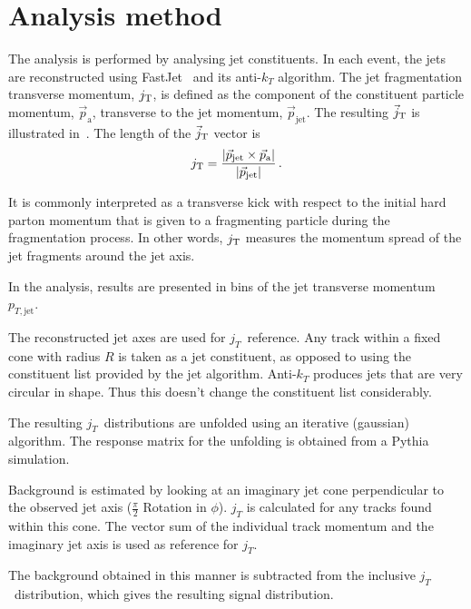 \section{Analysis method}
\label{sec:methods}

The analysis is performed by analysing jet constituents. In each event, the jets are reconstructed using FastJet~\cite{fastjet} and its anti-$k_T$ algorithm. The jet fragmentation transverse momentum, $j_{\rm T}$, is defined as the component of the constituent particle momentum, $\vec{p}_{\mathrm{a}}$, transverse to the jet momentum, $\vec{p}_{\mathrm{jet}}$. The resulting $\vec{j}_{\rm T}$ is illustrated in~. The length of the $\vec{j}_{\rm T}$ vector is
  \begin{equation}
    j_{\rm T} = \frac{|\vec{p}_{\mathrm{jet}} \times \vec{p}_{\mathrm{a}}|}{|\vec{p}_{\mathrm{jet}}|} \,.
  \label{eq:jtdefinition}
  \end{equation}

It is commonly interpreted as a transverse kick with respect to the initial hard parton momentum that is given to a fragmenting particle during the fragmentation process. In other words, $j_{\rm T}$ measures the momentum spread of the jet fragments around the jet axis. 

In the analysis, results are presented in bins of the jet transverse momentum $p_{T,\mathrm{jet}}$.

The reconstructed jet axes are used for $j_T$ reference. Any track within a fixed cone with radius $R$ is taken as a jet constituent, as opposed to using the constituent list provided by the jet algorithm. Anti-$k_T$ produces jets that are very circular in shape. Thus this doesn't change the constituent list considerably. 
 
The resulting $j_T$ distributions are unfolded using an iterative (gaussian) algorithm. The response matrix for the unfolding is obtained from a Pythia~\cite{} simulation. 

 
Background is estimated by looking at an imaginary jet cone perpendicular to the observed jet axis ($\frac{\pi}{2}$ Rotation in $\phi$). $j_T$ is calculated for any tracks found within this cone. The vector sum of the individual track momentum and the imaginary jet axis is used as reference for $j_T$. 

The background obtained in this manner is subtracted from the inclusive $j_T$ distribution, which gives the resulting signal distribution.
 

